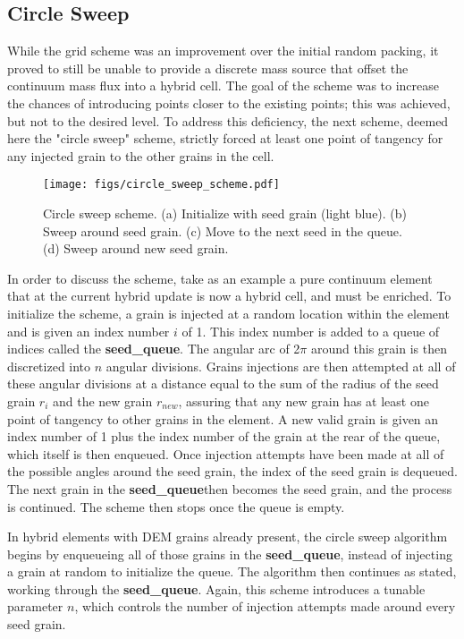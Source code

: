 \subsection{Circle Sweep}
\def\seed{\textbf{seed\_queue}}
While the grid scheme was an improvement over the initial random packing, it proved to still be unable to provide a discrete mass source that offset the continuum mass flux into a hybrid cell. The goal of the scheme was to increase the chances of introducing points closer to the existing points; this was achieved, but not to the desired level. To address this deficiency, the next scheme, deemed here the "circle sweep" scheme, strictly forced at least one point of tangency for any injected grain to the other grains in the cell.

\begin{figure}[htp] 
    \centering
    \texttt{[image: figs/circle\_sweep\_scheme.pdf]}
    \caption{Circle sweep scheme. (a) Initialize with seed grain (light blue). (b) Sweep around seed grain. (c) Move to the next seed in the queue. (d) Sweep around new seed grain.}
    \label{circle_sweep_enrichment}
\end{figure}

In order to discuss the scheme, take as an example a pure continuum element that at the current hybrid update is now a hybrid cell, and must be enriched. To initialize the scheme, a grain is injected at a random location within the element and is given an index number $i$ of 1. This index number is added to a queue of indices called the \seed. The angular arc of 2$\pi$ around this grain is then discretized into $n$ angular divisions. Grains injections are then attempted at all of these angular divisions at a distance equal to the sum of the radius of the seed grain $r_i$ and the new grain $r_{new}$, assuring that any new grain has at least one point of tangency to other grains in the element. A new valid grain is given an index number of 1 plus the index number of the grain at the rear of the queue, which itself is then enqueued. Once injection attempts have been made at all of the possible angles around the seed grain, the index of the seed grain is dequeued. The next grain in the \seed then becomes the seed grain, and the process is continued. The scheme then stops once the queue is empty.

In hybrid elements with DEM grains already present, the circle sweep algorithm begins by enqueueing all of those grains in the \seed, instead of injecting a grain at random to initialize the queue. The algorithm then continues as stated, working through the \seed. Again, this scheme introduces a tunable parameter $n$, which controls the number of injection attempts made around every seed grain.


